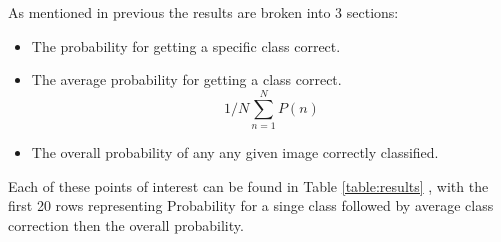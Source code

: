 \documentclass[11pt,a4paper]{article}
\begin{document}
As mentioned in previous the results are broken into 3 sections:

\begin{itemize}
  \item The probability for getting a specific class correct.
  \item The average probability for getting a class correct.
  \[ 1/N\sum_{n=1}^{N} P(n)\] 
  \begin{center}
  \end{center}
  \item The overall probability of any any given image correctly classified.
\end{itemize}

Each of these points of interest can be found in Table \ref{table:results}
, with the first 20 rows representing Probability for a singe class followed by average class correction then the overall probability. 
\end{document}
